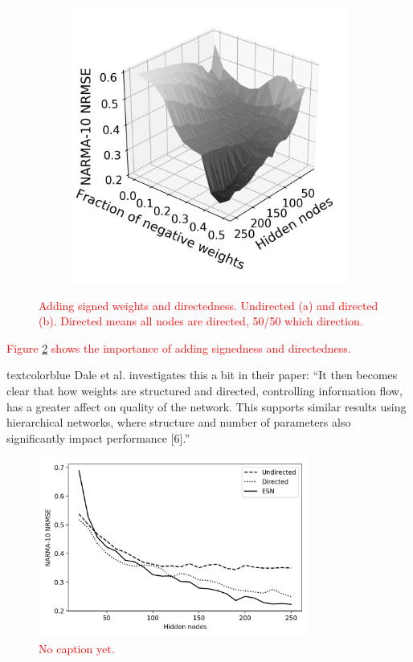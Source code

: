 \begin{figure}[t]
\begin{subfigure}{.49\textwidth}
    \includegraphics[width=1.0\linewidth]{figures/perf-rest-dir.png}
    \caption{}
    \label{fig:perf-restore-b}
  \end{subfigure}
  \caption{
    \textcolor{red}{
      Adding signed weights and directedness. Undirected (a) and directed
(b). Directed means all nodes are directed, 50/50 which direction.
    }
  }
  \label{fig:perf-restore}
\end{figure}

\textcolor{red}{
  Figure \ref{fig:perf-restore} shows the importance of adding signedness and
directedness.
}

textcolor{blue}{
  Dale et al. investigates this a bit in their paper: ``It then becomes clear
that how weights are structured and directed, controlling information flow, has
a greater affect on quality of the network. This supports similar results using
hierarchical networks, where structure and number of parameters also
significantly impact performance [6].''
}

\begin{figure}[t]
  \centering
  \includegraphics[width=3.5in]{figures/perf-rest-comp.png}
  \caption{
    \textcolor{red}{
      No caption yet.
    }
  }
  \label{fig:perf-rest-comp}
\end{figure}

